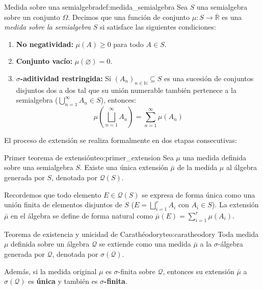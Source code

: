 \begin{definicion}{Medida sobre una semialgebra}{def:medida_semialgebra}
Sea $S$ una semialgebra sobre un conjunto $\Omega$. Decimos que una función de conjunto $\mu : S \to \overline{\mathbb{R}}$ es una \textit{medida sobre la semialgebra} $S$ si satisface las siguientes condiciones:
\begin{enumerate}[label=\alph*)]
    \item \textbf{No negatividad:} $\mu(A) \ge 0$ para todo $A \in S$.
    \item \textbf{Conjunto vacío:} $\mu(\varnothing) = 0$.
    \item \textbf{$\sigma$-aditividad restringida:} Si $(A_n)_{n \in \mathbb{N}} \subseteq S$ es una sucesión de conjuntos disjuntos dos a dos tal que su unión numerable también pertenece a la semialgebra ($\bigcup_{n=1}^\infty A_n \in S$), entonces:
    \[
        \mu\left( \bigsqcup_{n=1}^\infty A_n \right) = \sum_{n=1}^\infty \mu(A_n)
    \]
\end{enumerate}
\end{definicion}

\begin{center}
    \vspace{0.2cm}
    \vspace{0.2cm}
\end{center}

El proceso de extensión se realiza formalmente en dos etapas consecutivas:

\begin{teorema}{Primer teorema de extensión}{teo:primer_extension}
Sea $\mu$ una medida definida sobre una semialgebra $S$. Existe una única extensión $\bar{\mu}$ de la medida $\mu$ al álgebra generada por $S$, denotada por $\mathcal{Q}(S)$.
\end{teorema}

\begin{observacion}
Recordemos que todo elemento $E \in \mathcal{Q}(S)$ se expresa de forma única como una unión finita de elementos disjuntos de $S$ ($E = \bigsqcup_{i=1}^r A_i$ con $A_i \in S$). La extensión $\bar{\mu}$ en el álgebra se define de forma natural como $\bar{\mu}(E) = \sum_{i=1}^r \mu(A_i)$.
\end{observacion}

\begin{teorema}{Teorema de existencia y unicidad de Carathéodory}{teo:caratheodory}
Toda medida $\mu$ definida sobre un álgebra $\mathcal{Q}$ se extiende como una medida $\bar{\mu}$ a la $\sigma$-álgebra generada por $\mathcal{Q}$, denotada por $\sigma(\mathcal{Q})$.

Además, si la medida original $\mu$ es $\sigma$-finita sobre $\mathcal{Q}$, entonces su extensión $\bar{\mu}$ a $\sigma(\mathcal{Q})$ es \textbf{única} y también es \textbf{$\sigma$-finita}.
\end{teorema}

